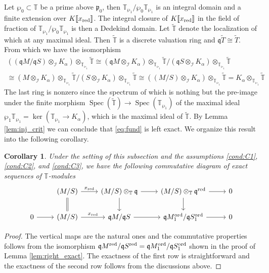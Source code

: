 \documentclass[leqno]{amsart}
\newtheorem{cor}[thm]{Corollary}
\theoremstyle{definition}
\theoremstyle{remark}
\DeclareMathOperator{\Spec}{Spec}
\newcommand{\fp}{\mathfrak{p}}
\newcommand{\fq}{\mathfrak{q}}
\newcommand{\red}{\textnormal{red}}
\newcommand{\xx}{x_\textnormal{red}}
\newcommand{\TT}{\mathbb{T}} %
\newcommand{\I}{\mathcal{I}} %
\newcommand{\ord}{\textnormal{ord}} %
\begin{document}
Let $\wp_0\subset \TT$ be a prime above $\fp_0$,
then $\TT_{\wp_1}/\wp_0\TT_{\wp_1}$
is an integral domain and a finite extension
over $K\llbracket\xx\rrbracket$.
The integral closure of $K\llbracket\xx\rrbracket$
in the field of fraction of 
$\TT_{\wp_1}/\wp_0\TT_{\wp_1}$ is then a Dedekind domain.
Let $\tilde{\TT}$ denote the localization of which
at any maximal ideal.
Then $\tilde{\TT}$ is a discrete valuation ring
and $\fq\tilde{T}\cong \tilde{T}$.
From which we have the isomorphism
\begin{multline*}
((\fq M/\fq S)\otimes_{\I} K_\alpha)
\otimes_{\TT_{\wp_1}}\tilde{\TT}\cong 
(\fq M\otimes_{\I} K_\alpha)
\otimes_{\TT_{\wp_1}}\tilde{\TT}/
(\fq S\otimes_{\I} K_\alpha)
\otimes_{\TT_{\wp_1}}\tilde{\TT}\\\cong
(M\otimes_{\I} K_\alpha)
\otimes_{\TT_{\wp_1}}\tilde{\TT}/
(S\otimes_{\I} K_\alpha)
\otimes_{\TT_{\wp_1}}\tilde{\TT}\cong
((M/S)\otimes_{\I} K_\alpha)
\otimes_{\TT_{\wp_1}}\tilde{\TT}=
K_\alpha \otimes_{\TT_{\wp_1}}\tilde{\TT}
\end{multline*}
The last ring is nonzero since 
the spectrum of which 
is nothing but the pre-image
under the finite morphism
$\Spec(\tilde{\TT})\to \Spec(\TT_{\wp_1})$
of the maximal ideal $\wp_1\TT_{\wp_1}=\ker(\TT_{\wp_1}\to K_\alpha)$,
which is the maximal ideal of $\tilde{\TT}$.
By Lemma \ref{lem:inj_crit}
we can conclude that \eqref{eq:fund} is left exact.
We organize this result into the following corollary.


\begin{cor}\label{cor:fund}
	Under the setting of this subsection
    and the assumptions
    \ref{cond:C1},
    \ref{cond:C2}, and
    \ref{cond:C3},
    we have the following commutative diagram
    of exact sequences of $\TT$-modules
    \begin{equation}
    \begin{tikzcd}
    & (M/S)
    \arrow[r,"\xx"]\arrow[d,equal] &
    (M/S)\otimes_{\TT}\fq
    \arrow[r]\arrow[d] &
    (M/S)\otimes_{\TT}\fq^\red
    \arrow[r]\arrow[d] &0\\
    0\arrow[r] &
    (M/S)
    \arrow[r,"\xx"] &
    \fq M/\fq S
    \arrow[r] &
    \fq M_1^{\ord}/\fq S_1^{\ord}
    \arrow[r] &0
    \end{tikzcd}
    \end{equation}
\end{cor}
\begin{proof}
The vertical maps are the natural ones
and the commutative properties 
follows from the isomorphism
$\fq M^\red/\fq S^\red=\fq M_1^{\ord}/\fq S_1^{\ord}$
shown in the proof of Lemma \ref{lem:right_exact}.
The exactness of the first row
is straightforward and
the exactness of the second row
follows from the discussions above.
\end{proof}
\end{document}
